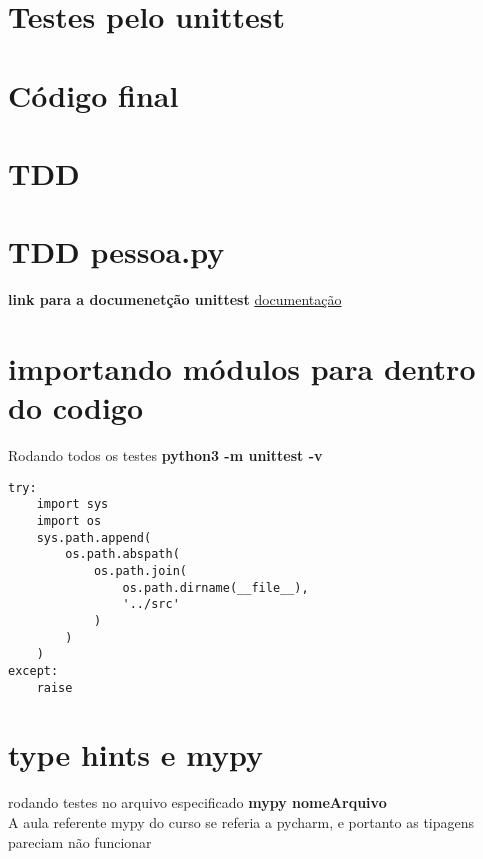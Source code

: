 \documentclass[letterpaper]{article}
\begin{document}
\section{Testes pelo unittest}




\section{Código final}





\section{TDD}



\section{TDD  pessoa.py}
\textbf{link para a documenetção unittest}
\href{https://docs.python.org/pt-br/3/library/unittest.html#setupclass-and-teardownclass}{documentação}


\section{importando módulos para dentro do codigo}
Rodando todos os testes 
\textbf{ python3 -m  unittest -v}

\begin{lstlisting}[style=mystyle, title= importação ] 
    try:
    import sys
    import os
    sys.path.append(
        os.path.abspath(
            os.path.join(
                os.path.dirname(__file__),
                '../src'
            )
        )
    )
except:
    raise
\end{lstlisting}

\section{type hints e mypy}
rodando testes no arquivo especificado
\textbf{mypy nomeArquivo}\\
A aula referente mypy do curso se referia a pycharm, e portanto as tipagens pareciam não funcionar


\end{document}
